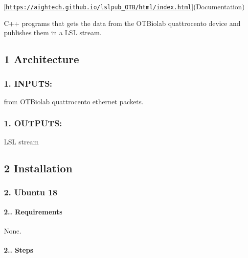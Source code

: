 \mbox{[}\href{https://aightech.github.io/lslpub_OTB/html/index.html}{\tt https\+://aightech.\+github.\+io/lslpub\+\_\+\+O\+T\+B/html/index.\+html}\mbox{]}(Documentation)

C++ programs that gets the data from the O\+T\+Biolab quattrocento device and publishes them in a L\+SL stream.

\subsection*{1 Architecture}

\subsubsection*{1. I\+N\+P\+U\+TS\+:}


\begin{DoxyItemize}
\item from O\+T\+Biolab quattrocento ethernet packets. \subsubsection*{1. O\+U\+T\+P\+U\+TS\+:}
\end{DoxyItemize}


\begin{DoxyItemize}
\item L\+SL stream
\end{DoxyItemize}

\subsection*{2 Installation}

\subsubsection*{2. Ubuntu 18}

\paragraph*{2.. {\bfseries Requirements}}

None. \paragraph*{2.. Steps}


